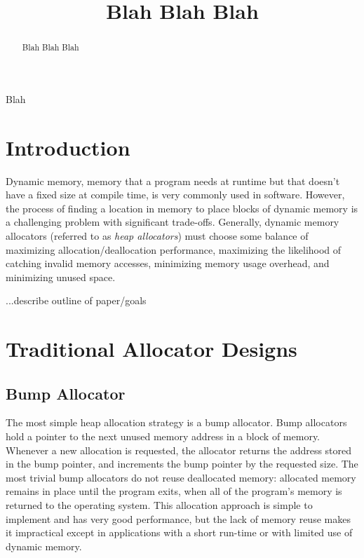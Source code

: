 \documentclass[conference]{IEEEtran}
\begin{document}
\title{\color{red}Blah Blah Blah}

\author{
}

\maketitle

\begin{abstract}
	\color{red} Blah Blah Blah
\end{abstract}

\begin{IEEEkeywords}
	\color{red} Blah
\end{IEEEkeywords}

\section{Introduction}
Dynamic memory, memory that a program needs at runtime but that doesn't have a fixed size at compile time, is very commonly used in software.
However, the process of finding a location in memory to place blocks of dynamic memory is a challenging problem with significant trade-offs.
Generally, dynamic memory allocators (referred to as \emph{heap allocators}) must choose some balance of maximizing allocation/deallocation performance, maximizing the likelihood of catching invalid memory accesses, minimizing memory usage overhead, and minimizing unused space.

	{\color{red}...describe outline of paper/goals}

\section{Traditional Allocator Designs}

\subsection{Bump Allocator}

The most simple heap allocation strategy is a bump allocator.
Bump allocators hold a pointer to the next unused memory address in a block of memory.
Whenever a new allocation is requested, the allocator returns the address stored in the bump pointer, and increments the bump pointer by the requested size.
The most trivial bump allocators do not reuse deallocated memory: allocated memory remains in place until the program exits, when all of the program's memory is returned to the operating system.
This allocation approach is simple to implement and has very good performance, but the lack of memory reuse makes it impractical except in applications with a short run-time or with limited use of dynamic memory.
\end{document}
